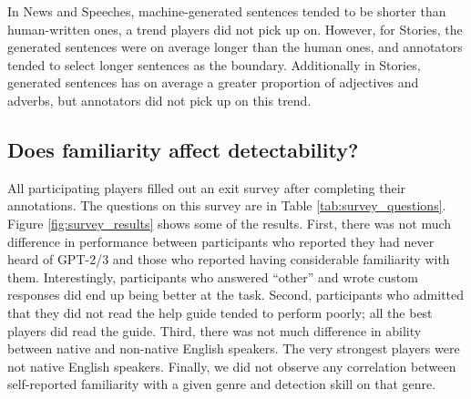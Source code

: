 In News and Speeches, machine-generated sentences tended to be shorter than human-written ones, a trend players did not pick up on.
However, for Stories, the generated sentences were on average longer than the human ones, and annotators tended to select longer sentences as the boundary.
Additionally in Stories, generated sentences has on average a greater proportion of adjectives and adverbs, but annotators did not pick up on this trend.


\subsection{Does familiarity affect detectability?}
All participating players filled out an exit survey after completing their annotations. The questions on this survey are in Table \ref{tab:survey_questions}.
Figure \ref{fig:survey_results} shows some of the results.
First, there was not much difference in performance between participants who reported they had never heard of GPT-2/3 and those who reported having considerable familiarity with them.
Interestingly, participants who answered ``other'' and wrote custom responses did end up being better at the task.
Second, participants who admitted that they did not read the help guide tended to perform poorly; all the best players did read the guide.
Third, there was not much difference in ability between native and non-native English speakers.
The very strongest players were not native English speakers.
Finally, we did not observe any correlation between self-reported familiarity with a given genre and detection skill on that genre.

